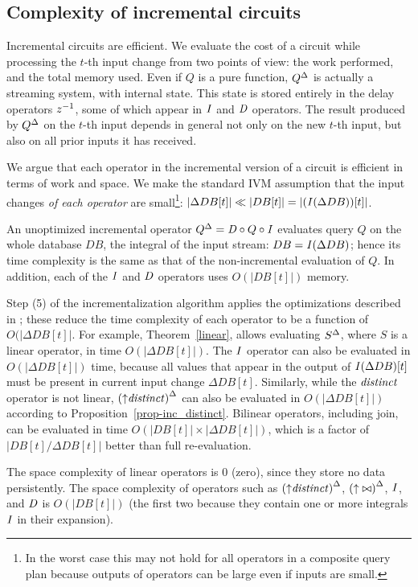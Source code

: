 \subsection{Complexity of incremental circuits}\label{sec:complexity}

Incremental circuits are efficient.  We evaluate the cost of a circuit while processing the
$t$-th input change from two points of view: the work performed, and the total memory used.
Even if $Q$ is a pure function, ${Q}^{\Delta}$ is actually a streaming system, with internal state.
This state is stored entirely in the delay operators $z^{-1}$, some of which appear in $\mathit{I}$ and $\mathit{D}$ operators.
The result produced by ${Q}^{\Delta}$ on the $t$-th input depends in general not only on the new
$t$-th input, but also on all prior inputs it has received.

We argue that each operator in the incremental version of a circuit is efficient in
terms of work and space.  We make the standard IVM assumption that the input changes \emph{of each operator}
are small\footnote{In the worst case this may not hold for all operators in a composite
query plan because outputs of operators can be large even if inputs are small.}: $|\Delta DB[t]| \ll |DB[t]| = |(\mathit{I}(\Delta DB))[t]|$.

An unoptimized incremental operator ${Q}^{\Delta} = \mathit{D} \circ Q \circ \mathit{I}$
evaluates query $Q$ on the whole database $DB$, the integral of the input stream:
$DB = \mathit{I}(\Delta DB)$; hence its time complexity  is the same as that of the non-incremental
evaluation of $Q$.  In addition, each of the $\mathit{I}$ and $\mathit{D}$ operators uses $O(|DB[t]|)$ memory.

Step (5) of the incrementalization algorithm applies the optimizations described in ;
these reduce the time complexity of each operator to be a function of $O(|\Delta DB[t]|$.
For example, Theorem~\ref{linear}, allows evaluating ${S}^{\Delta}$, where $S$ is a
linear operator, in time $O(|\Delta DB[t]|)$.  The $\mathit{I}$
operator can also be evaluated in $O(|\Delta DB[t]|)$ time, because
all values that appear in the output of $\mathit{I}(\Delta DB)[t]$ must be present in
current input change $\Delta DB[t]$.  Similarly, while the $\mathit{distinct}$ operator is not
linear, ${({\uparrow}\mathit{distinct})}^{\Delta}$ can also be evaluated in $O(|\Delta DB[t]|)$ according to
Proposition~\ref{prop-inc_distinct}.  Bilinear operators, including join, can be
evaluated in time $O(|DB[t]| \times |\Delta DB[t]|)$, which is a factor of $|DB[t] / \Delta DB[t]|$
better than full re-evaluation.

The space complexity of linear operators is 0 (zero), since they store no
data persistently.  The space complexity of operators such as ${({\uparrow}\mathit{distinct})}^{\Delta}$,
${({\uparrow}\bowtie)}^{\Delta}$, $\mathit{I}$, and $\mathit{D}$ is $O(|DB[t]|)$ (the first two
because they contain one or more integrals $\mathit{I}$ in their expansion).
